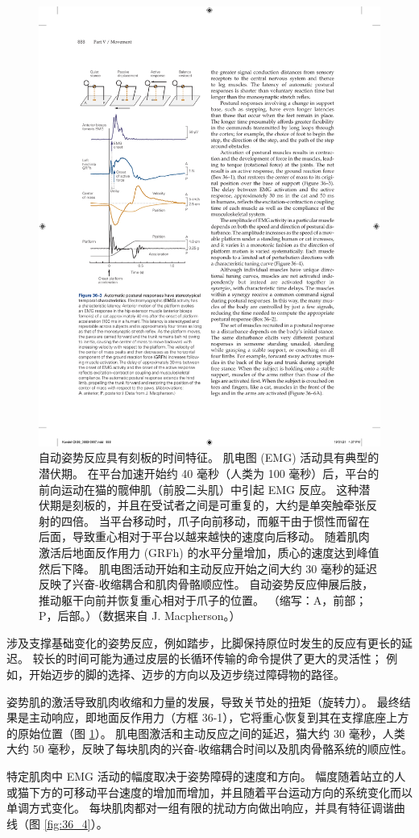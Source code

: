 \begin{figure}[htbp]
	\centering
	\includegraphics[width=0.5\linewidth]{chap36/fig_36_3}
	\caption{自动姿势反应具有刻板的时间特征。 肌电图 (EMG) 活动具有典型的潜伏期。 在平台加速开始约 40 毫秒（人类为 100 毫秒）后，平台的前向运动在猫的髋伸肌（前股二头肌）中引起 EMG 反应。 这种潜伏期是刻板的，并且在受试者之间是可重复的，大约是单突触牵张反射的四倍。 当平台移动时，爪子向前移动，而躯干由于惯性而留在后面，导致重心相对于平台以越来越快的速度向后移动。 随着肌肉激活后地面反作用力 (GRFh) 的水平分量增加，质心的速度达到峰值然后下降。 肌电图活动开始和主动反应开始之间大约 30 毫秒的延迟反映了兴奋-收缩耦合和肌肉骨骼顺应性。 自动姿势反应伸展后肢，推动躯干向前并恢复重心相对于爪子的位置。 （缩写：A，前部；P，后部。）（数据来自 J. Macpherson。）}
	\label{fig:36_3}
\end{figure}

涉及支撑基础变化的姿势反应，例如踏步，比脚保持原位时发生的反应有更长的延迟。 较长的时间可能为通过皮层的长循环传输的命令提供了更大的灵活性； 例如，开始迈步的脚的选择、迈步的方向以及迈步绕过障碍物的路径。

姿势肌的激活导致肌肉收缩和力量的发展，导致关节处的扭矩（旋转力）。 最终结果是主动响应，即地面反作用力（方框 36-1），它将重心恢复到其在支撑底座上方的原始位置（图 \ref{fig:36_3}）。 肌电图激活和主动反应之间的延迟，猫大约 30 毫秒，人类大约 50 毫秒，反映了每块肌肉的兴奋-收缩耦合时间以及肌肉骨骼系统的顺应性。

特定肌肉中 EMG 活动的幅度取决于姿势障碍的速度和方向。 幅度随着站立的人或猫下方的可移动平台速度的增加而增加，并且随着平台运动方向的系统变化而以单调方式变化。 
每块肌肉都对一组有限的扰动方向做出响应，并具有特征调谐曲线（图 \ref{fig:36_4}）。

